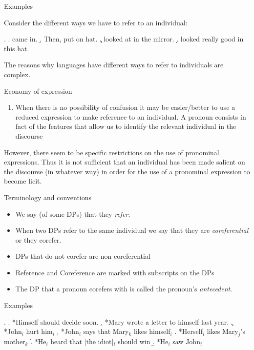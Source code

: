 \begin{frame}
  {Examples}

Consider the different ways we have to refer to an individual:

\ex. 
\a.  came in.
\b. Then,  put on  hat.
\c.  looked at  in the mirror.
\d.  looked really good in this hat. 

The reasons why languages have different ways to refer to individuals are complex.


\end{frame}

 
\begin{frame}
{Economy of expression}
  \begin{enumerate}
  \item[] When there is no possibility of confusion it may be easier/better to use a reduced expression to make reference to an individual.  A pronoun consists in fact of the features that allow us to identify the relevant individual in the discourse
  \end{enumerate}

However, there seem to be specific restrictions on the use of pronominal expressions.  Thus it is not sufficient that an individual has been made salient on the discourse (in whatever way) in order for the use of a pronominal expression to become licit.


\end{frame}

\begin{frame}
  {Terminology and conventions}

\begin{itemize}
\item We say (of some DPs) that they \textit{refer}. 
\item When two DPs refer to the same individual we say that they are \textit{coreferential} or they corefer.
\item DPs that do not corefer are non-coreferential
\item Reference and Coreference are marked with subscripts on the DPs
\item The DP that a pronoun corefers with is called the pronoun's \textit{antecedent}.
\end{itemize} 
\end{frame}


\begin{frame}
  {Examples}

\ex.
\a. *Himself should decide soon.
\b. *Mary wrote a letter to himself last year.
\c. *John$_i$ hurt him$_i$
\d. *John$_i$ says that Mary$_k$ likes himself$_i$
\e. *Herself$_i$ likes Mary$_j$'s mother$_k$
\f. *He$_i$ heard that [the idiot]$_i$ should win
\b. *He$_i$ saw John$_i$ 

\end{frame}

